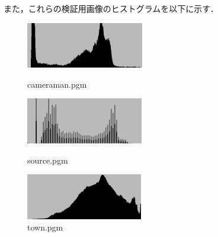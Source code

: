 \documentclass{jsarticle}
\begin{document}
また，これらの検証用画像のヒストグラムを以下に示す．
\begin{figure}[htbp]
 \begin{minipage}{0.33\hsize}
  \begin{center}
   \includegraphics[height=20mm]{cameraman_histogram.png}
  \end{center}
  \caption{cameraman.pgm}
  \label{fig:one}
 \end{minipage}
 \begin{minipage}{0.33\hsize}
  \begin{center}
   \includegraphics[height=20mm]{source_histogram.png}
  \end{center}
  \caption{source.pgm}
  \label{fig:two}
 \end{minipage}
 \begin{minipage}{0.33\hsize}
  \begin{center}
   \includegraphics[height=20mm]{town_histogram.png}
  \end{center}
  \caption{town.pgm}
  \label{fig:three}
 \end{minipage}
\end{figure}
\end{document}
